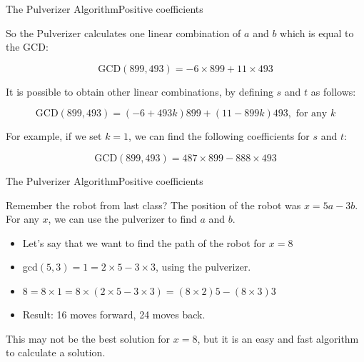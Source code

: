 \begin{frame}{The Pulverizer Algorithm}{Positive coefficients}

  So the Pulverizer calculates one linear combination of $a$ and $b$ which is equal to the GCD:

  \begin{equation*}
  \text{GCD}(899, 493) = -6\times 899 + 11\times 493
  \end{equation*}\bigskip

  It is possible to obtain other linear combinations, by defining $s$ and $t$ as follows:

  \begin{equation*}
    \text{GCD}(899, 493) = (-6 + 493k)899 + (11 - 899k)493, \text{ for any }k
  \end{equation*}\bigskip

  For example, if we set $k = 1$, we can find the following coefficients for $s$ and $t$:

  \begin{equation*}
    \text{GCD}(899, 493) = 487\times 899 - 888\times 493
  \end{equation*}

\end{frame}

\begin{frame}{The Pulverizer Algorithm}{Positive coefficients}

  Remember the robot from last class? The position of the robot was $x = 5a - 3b$. For any $x$, we can use the pulverizer to find $a$ and $b$.\bigskip

  \begin{itemize}
    \item Let's say that we want to find the path of the robot for $x = 8$
    \item gcd$(5,3) = 1 = 2\times5 - 3\times 3$, using the pulverizer.
    \item $8 = 8\times 1 = 8\times(2\times 5 - 3\times3) = (8\times2)5 - (8\times 3)3$
    \item Result: 16 moves forward, 24 moves back.
  \end{itemize}\bigskip

  This may not be the best solution for $x=8$, but it is an easy and fast algorithm to calculate a solution.
\end{frame}
